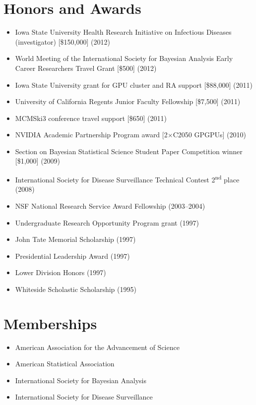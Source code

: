 \documentclass[overlapped,line,letterpaper]{res}
\begin{document}
\begin{resume}

\section{\bf Honors and Awards}
\begin{itemize}
\item Iowa State University Health Research Initiative on Infectious Diseases (investigator) [\$150,000] (2012)
\item World Meeting of the International Society for Bayesian Analysis Early Career Researchers Travel Grant [\$500] (2012)
\item Iowa State University grant for GPU cluster and RA support [\$88,000] (2011)
\item University of California Regents Junior Faculty Fellowship [\$7,500] (2011)
\item MCMSki3 conference travel support [\$650] (2011)
\item NVIDIA Academic Partnership Program award [2$\times$C2050 GPGPUs] (2010)
\item Section on Bayesian Statistical Science Student Paper Competition winner [\$1,000] (2009)
\item International Society for Disease Surveillance Technical Contest 2\textsuperscript{nd} place (2008)
\item NSF National Research Service Award Fellowship (2003--2004)
\item Undergraduate Research Opportunity Program grant (1997)
\item John Tate Memorial Scholarship (1997)
\item Presidential Leadership Award (1997)
\item Lower Division Honors (1997)
\item Whiteside Scholastic Scholarship (1995)
\end{itemize}


\section{\bf Memberships}
\begin{itemize}
\item American Association for the Advancement of Science
\item American Statistical Association
\item International Society for Bayesian Analysis
\item International Society for Disease Surveillance
\end{itemize}


\end{resume}
\end{document}
